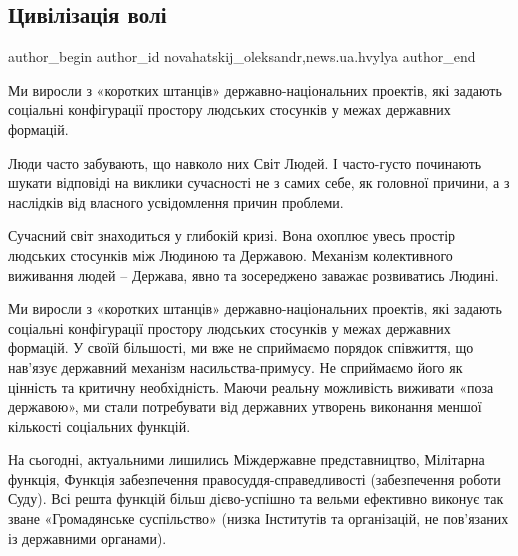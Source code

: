  
 
 
 
 
\subsection{Цивілізація волі}
\label{sec:03_01_2022.stz.news.ua.hvylya.1.civilizacia_voli}

\ifcmt
 author_begin
   author_id novahatskij_oleksandr,news.ua.hvylya
 author_end
\fi

\begin{zznagolos}
Ми виросли з «коротких штанців» державно-національних проектів, які задають
соціальні конфігурації простору людських стосунків у межах державних формацій.
\end{zznagolos}


Люди часто забувають, що навколо них Світ Людей. І часто-густо починають шукати
відповіді на виклики сучасності не з самих себе, як головної причини, а з
наслідків від власного усвідомлення причин проблеми.

Сучасний світ знаходиться у глибокій кризі. Вона охоплює увесь простір людських
стосунків між Людиною та Державою. Механізм колективного виживання людей –
Держава, явно та зосереджено заважає розвиватись Людині.

Ми виросли з «коротких штанців» державно-національних проектів, які задають
соціальні конфігурації простору людських стосунків у межах державних формацій.
У своїй більшості, ми вже не сприймаємо порядок співжиття, що нав’язує
державний механізм насильства-примусу. Не сприймаємо його як цінність та
критичну необхідність. Маючи реальну можливість виживати «поза державою», ми
стали потребувати від державних утворень виконання меншої кількості соціальних
функцій.

На сьогодні, актуальними лишились Міждержавне представництво, Мілітарна
функція, Функція забезпечення правосуддя-справедливості (забезпечення роботи
Суду). Всі решта функцій більш дієво-успішно та вельми ефективно виконує так
зване «Громадянське суспільство» (низка Інститутів та організацій, не
пов’язаних із державними органами).

